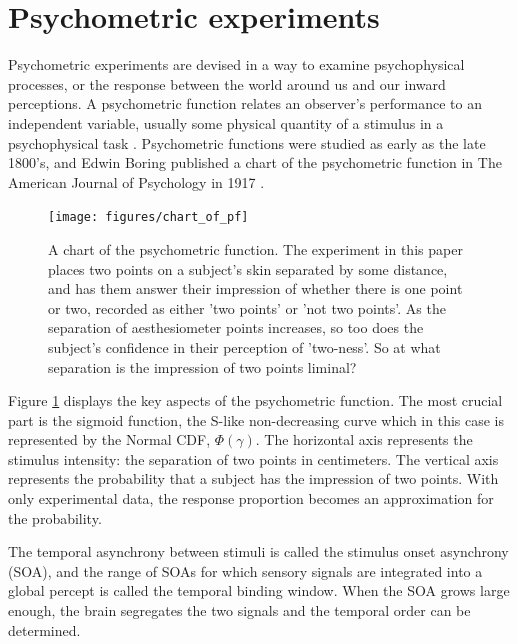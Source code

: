 \documentclass[11pt, oneside, openany]{scrbook}
\begin{document}
\hypertarget{psycho-experiments}{%
\section{Psychometric experiments}\label{psycho-experiments}}

Psychometric experiments are devised in a way to examine psychophysical processes, or the response between the world around us and our inward perceptions. A psychometric function relates an observer's performance to an independent variable, usually some physical quantity of a stimulus in a psychophysical task \citep{wichmann2001a}. Psychometric functions were studied as early as the late 1800's, and Edwin Boring published a chart of the psychometric function in The American Journal of Psychology in 1917 \citep{boring1917chart}.

\begin{figure}

{\centering \texttt{[image: figures/chart\_of\_pf]} 

}

\caption{A chart of the psychometric function. The experiment in this paper places two points on a subject's skin separated by some distance, and has them answer their impression of whether there is one point or two, recorded as either 'two points' or 'not two points'. As the separation of aesthesiometer points increases, so too does the subject's confidence in their perception of 'two-ness'. So at what separation is the impression of two points liminal?}\label{fig:ch020-chart-of-pf}
\end{figure}

Figure \ref{fig:ch020-chart-of-pf} displays the key aspects of the psychometric function. The most crucial part is the sigmoid function, the S-like non-decreasing curve which in this case is represented by the Normal CDF, \(\Phi(\gamma)\). The horizontal axis represents the stimulus intensity: the separation of two points in centimeters. The vertical axis represents the probability that a subject has the impression of two points. With only experimental data, the response proportion becomes an approximation for the probability.

The temporal asynchrony between stimuli is called the stimulus onset asynchrony (SOA), and the range of SOAs for which sensory signals are integrated into a global percept is called the temporal binding window. When the SOA grows large enough, the brain segregates the two signals and the temporal order can be determined.
\end{document}
